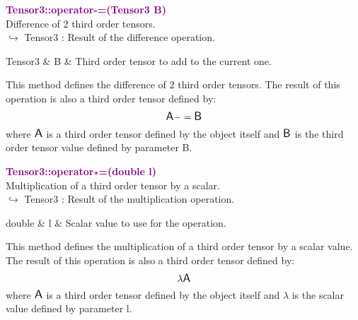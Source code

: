 \textcolor{purple}{\textbf{Tensor3::operator-=(Tensor3 B)}}\label{Tensor3::operator-=(Tensor3 B)}\\
Difference of 2 third order tensors.\\ \hspace*{10mm}$\hookrightarrow$ Tensor3 : Result of the difference operation.

\begin{tcolorbox}[width=\textwidth,myArgs,tabularx={ll|R}]
Tensor3 & B & Third order tensor to add to the current one.
\end{tcolorbox}

This method defines the difference of 2 third order tensors.
The result of this operation is also a third order tensor defined by:
\begin{equation*}
\mbox{\large\ensuremath{\mathsf{A}}} -= \mbox{\large\ensuremath{\mathsf{B}}}
\end{equation*}
where $\mbox{\large\ensuremath{\mathsf{A}}}$ is a third order tensor defined by the object itself and $\mbox{\large\ensuremath{\mathsf{B}}}$ is the third order tensor value defined by parameter B.

\textcolor{purple}{\textbf{Tensor3::operator$\star$=(double l)}}\label{Tensor3::operator*=(double l)}\\
Multiplication of a third order tensor by a scalar.\\ \hspace*{10mm}$\hookrightarrow$ Tensor3 : Result of the multiplication operation.

\begin{tcolorbox}[width=\textwidth,myArgs,tabularx={ll|R}]
double & l & Scalar value to use for the operation.
\end{tcolorbox}

This method defines the multiplication of a third order tensor by a scalar value.
The result of this operation is also a third order tensor defined by:
\begin{equation*}
\lambda \mbox{\large\ensuremath{\mathsf{A}}}
\end{equation*}
where $\mbox{\large\ensuremath{\mathsf{A}}}$ is a third order tensor defined by the object itself and $\lambda$ is the scalar value defined by parameter l.

